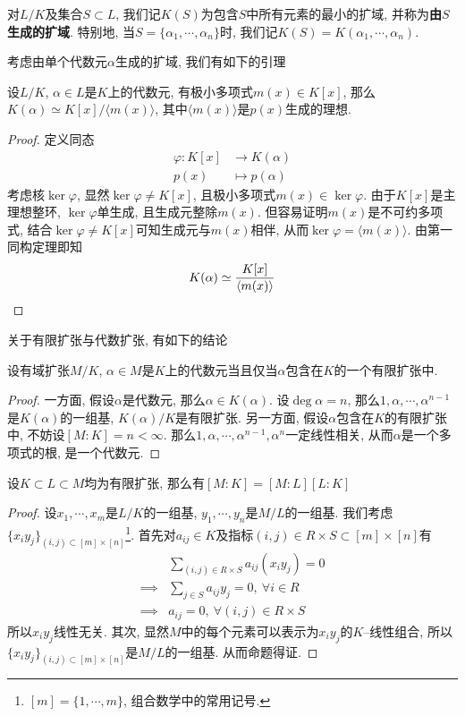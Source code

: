 \begin{sym}
    对$L/K$及集合$S\subset L$, 我们记$K(S)$为包含$S$中所有元素的最小的扩域, 并称为\textbf{由$S$生成的扩域}.
    特别地, 当$S=\{\alpha_1,\cdots,\alpha_n\}$时, 我们记$K(S)=K(\alpha_1,\cdots,\alpha_n)$.
\end{sym}

考虑由单个代数元$\alpha$生成的扩域, 我们有如下的引理
\begin{lem}
    设$L/K$, $\alpha\in L$是$K$上的代数元, 有极小多项式$m(x)\in K[x]$, 那么$K(\alpha)\simeq K[x]/\langle m(x)\rangle$, 其中$\langle m(x)\rangle$是$p(x)$生成的理想.
\end{lem}
\begin{proof}
    定义同态
    \begin{align*}
        \varphi:K[x]&\to K(\alpha)\\
        p(x)&\mapsto p(\alpha)
    \end{align*}
    考虑核$\ker\varphi$, 显然$\ker\varphi\neq K[x]$, 且极小多项式$m(x)\in\ker\varphi$.
    由于$K[x]$是主理想整环, $\ker\varphi$单生成, 且生成元整除$m(x)$.
    但容易证明$m(x)$是不可约多项式, 结合$\ker\varphi\neq K[x]$可知生成元与$m(x)$相伴, 从而$\ker\varphi=\langle m(x)\rangle$.
    由第一同构定理即知
    \[K(\alpha)\simeq \frac{K[x]}{\langle m(x)\rangle}\qedhere\]
\end{proof}

关于有限扩张与代数扩张, 有如下的结论
\begin{thm}
    设有域扩张$M/K$, $\alpha\in M$是$K$上的代数元当且仅当$\alpha$包含在$K$的一个有限扩张中.
\end{thm}
\begin{proof}
    一方面, 假设$\alpha$是代数元, 那么$\alpha\in K(\alpha)$.
    设$\deg\alpha=n$, 那么$1,\alpha,\cdots,\alpha^{n-1}$是$K(\alpha)$的一组基, $K(\alpha)/K$是有限扩张.
    另一方面, 假设$\alpha$包含在$K$的有限扩张中, 不妨设$[M:K]=n<\infty$.
    那么$1,\alpha,\cdots,\alpha^{n-1},\alpha^n$一定线性相关, 从而$\alpha$是一个多项式的根, 是一个代数元.
\end{proof}

\begin{thm}[望远镜公式]\label{telescope}
    设$K\subset L\subset M$均为有限扩张, 那么有$[M:K]=[M:L][L:K]$
\end{thm}
\begin{proof}
    设$x_1,\cdots,x_m$是$L/K$的一组基, $y_1,\cdots,y_n$是$M/L$的一组基.
    我们考虑$\{x_iy_j\}_{(i,j)\subset [m]\times[n]}$\footnote{$[m]=\{1,\cdots,m\}$, 组合数学中的常用记号.}.
    首先对$a_{ij}\in K$及指标$(i,j)\in R\times S\subset [m]\times[n]$有
    \begin{align*}
        &\sum_{(i,j)\in R\times S}a_{ij}(x_iy_j)=0\\
        \implies&\sum_{j\in S}a_{ij}y_j=0,\ \forall i\in R\\
        \implies&a_{ij}=0,\ \forall (i,j)\in R\times S
    \end{align*}
    所以$x_iy_j$线性无关.
    其次, 显然$M$中的每个元素可以表示为$x_iy_j$的$K$--线性组合, 所以$\{x_iy_j\}_{(i,j)\subset [m]\times[n]}$是$M/L$的一组基.
    从而命题得证.
\end{proof}

